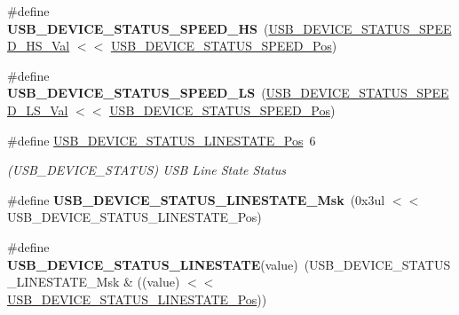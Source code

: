 \begin{DoxyCompactItemize}
\item 
\hypertarget{group___s_a_m_l21___u_s_b_gaff2f3e0cfef7092583bb0677ea94971d}{}\#define {\bfseries U\+S\+B\+\_\+\+D\+E\+V\+I\+C\+E\+\_\+\+S\+T\+A\+T\+U\+S\+\_\+\+S\+P\+E\+E\+D\+\_\+\+H\+S}~(\hyperlink{group___s_a_m_l21___u_s_b_ga3bf95af6a2142f4c7bb7b3dcda290d52}{U\+S\+B\+\_\+\+D\+E\+V\+I\+C\+E\+\_\+\+S\+T\+A\+T\+U\+S\+\_\+\+S\+P\+E\+E\+D\+\_\+\+H\+S\+\_\+\+Val} $<$$<$ \hyperlink{group___s_a_m_l21___u_s_b_ga07dc661773fbafdaa2c54728657332bd}{U\+S\+B\+\_\+\+D\+E\+V\+I\+C\+E\+\_\+\+S\+T\+A\+T\+U\+S\+\_\+\+S\+P\+E\+E\+D\+\_\+\+Pos})\label{group___s_a_m_l21___u_s_b_gaff2f3e0cfef7092583bb0677ea94971d}

\item 
\hypertarget{group___s_a_m_l21___u_s_b_gace1fcdf3f18e417fc25d99c7add7813f}{}\#define {\bfseries U\+S\+B\+\_\+\+D\+E\+V\+I\+C\+E\+\_\+\+S\+T\+A\+T\+U\+S\+\_\+\+S\+P\+E\+E\+D\+\_\+\+L\+S}~(\hyperlink{group___s_a_m_l21___u_s_b_ga8a9061e2205790b27cefed8650edcd28}{U\+S\+B\+\_\+\+D\+E\+V\+I\+C\+E\+\_\+\+S\+T\+A\+T\+U\+S\+\_\+\+S\+P\+E\+E\+D\+\_\+\+L\+S\+\_\+\+Val} $<$$<$ \hyperlink{group___s_a_m_l21___u_s_b_ga07dc661773fbafdaa2c54728657332bd}{U\+S\+B\+\_\+\+D\+E\+V\+I\+C\+E\+\_\+\+S\+T\+A\+T\+U\+S\+\_\+\+S\+P\+E\+E\+D\+\_\+\+Pos})\label{group___s_a_m_l21___u_s_b_gace1fcdf3f18e417fc25d99c7add7813f}

\item 
\hypertarget{group___s_a_m_l21___u_s_b_ga8e62dd599a4f4a34806c7677b9eaec13}{}\#define \hyperlink{group___s_a_m_l21___u_s_b_ga8e62dd599a4f4a34806c7677b9eaec13}{U\+S\+B\+\_\+\+D\+E\+V\+I\+C\+E\+\_\+\+S\+T\+A\+T\+U\+S\+\_\+\+L\+I\+N\+E\+S\+T\+A\+T\+E\+\_\+\+Pos}~6\label{group___s_a_m_l21___u_s_b_ga8e62dd599a4f4a34806c7677b9eaec13}

\begin{DoxyCompactList}\small\item\em (U\+S\+B\+\_\+\+D\+E\+V\+I\+C\+E\+\_\+\+S\+T\+A\+T\+U\+S) U\+S\+B Line State Status \end{DoxyCompactList}\item 
\hypertarget{group___s_a_m_l21___u_s_b_gae4c5bb001e55193ff458fd84fdd1a054}{}\#define {\bfseries U\+S\+B\+\_\+\+D\+E\+V\+I\+C\+E\+\_\+\+S\+T\+A\+T\+U\+S\+\_\+\+L\+I\+N\+E\+S\+T\+A\+T\+E\+\_\+\+Msk}~(0x3ul $<$$<$ U\+S\+B\+\_\+\+D\+E\+V\+I\+C\+E\+\_\+\+S\+T\+A\+T\+U\+S\+\_\+\+L\+I\+N\+E\+S\+T\+A\+T\+E\+\_\+\+Pos)\label{group___s_a_m_l21___u_s_b_gae4c5bb001e55193ff458fd84fdd1a054}

\item 
\hypertarget{group___s_a_m_l21___u_s_b_gafec00050379b98671e72985b0d3ca232}{}\#define {\bfseries U\+S\+B\+\_\+\+D\+E\+V\+I\+C\+E\+\_\+\+S\+T\+A\+T\+U\+S\+\_\+\+L\+I\+N\+E\+S\+T\+A\+T\+E}(value)~(U\+S\+B\+\_\+\+D\+E\+V\+I\+C\+E\+\_\+\+S\+T\+A\+T\+U\+S\+\_\+\+L\+I\+N\+E\+S\+T\+A\+T\+E\+\_\+\+Msk \& ((value) $<$$<$ \hyperlink{group___s_a_m_l21___u_s_b_ga8e62dd599a4f4a34806c7677b9eaec13}{U\+S\+B\+\_\+\+D\+E\+V\+I\+C\+E\+\_\+\+S\+T\+A\+T\+U\+S\+\_\+\+L\+I\+N\+E\+S\+T\+A\+T\+E\+\_\+\+Pos}))\label{group___s_a_m_l21___u_s_b_gafec00050379b98671e72985b0d3ca232}


\end{DoxyCompactItemize}
